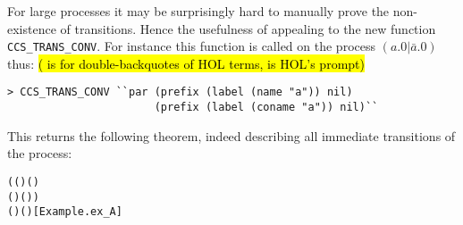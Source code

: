 For large processes it may be surprisingly hard to manually prove the
non-existence of transitions.  Hence the usefulness of appealing to 
the new  function \texttt{CCS\_TRANS\_CONV}. 
For instance this function
is called on the  process $(a.0 | \bar{a}.0)$ thus:
\hl{(\mbox{} is for double-backquotes of HOL
  terms, \mbox{\color{blue}{\texttt{>}}} is HOL's prompt)}
\begin{lstlisting}
> CCS_TRANS_CONV ``par (prefix (label (name "a")) nil)
                       (prefix (label (coname "a")) nil)``
\end{lstlisting}
This returns the following theorem, indeed describing all immediate
transitions of the process:
\begin{alltt}
\HOLTokenTurnstile{}   \HOLSymConst{\ensuremath{\parallel}}   \HOLTokenTransBegin{}\HOLTokenTransEnd {} \HOLSymConst{\HOLTokenEquiv{}}
   (( \HOLSymConst{=}  ) \HOLSymConst{\HOLTokenConj{}} ( \HOLSymConst{=}  \HOLSymConst{\ensuremath{\parallel}}  ) \HOLSymConst{\HOLTokenDisj{}}
    ( \HOLSymConst{=}  ) \HOLSymConst{\HOLTokenConj{}} ( \HOLSymConst{=}   \HOLSymConst{\ensuremath{\parallel}} )) \HOLSymConst{\HOLTokenDisj{}}
   ( \HOLSymConst{=} \HOLSymConst{\ensuremath{\tau}}) \HOLSymConst{\HOLTokenConj{}} ( \HOLSymConst{=}  \HOLSymConst{\ensuremath{\parallel}} )\hfill{[Example.ex_A]}
\end{alltt}
